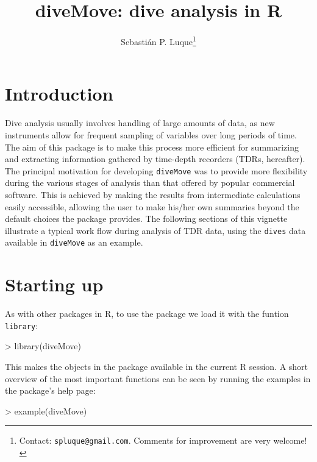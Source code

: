 \documentclass[12pt, letterpaper]{scrartcl}
\newcommand{\Robject}[1]{{\texttt{#1}}}
\newcommand{\Rfunction}[1]{{\texttt{#1}}}
\newcommand{\Rpackage}[1]{{\texttt{#1}}}
\newcommand{\R}{{\normalfont\textsf{R }}{}}
\begin{document}
\title{\bfseries{diveMove: dive analysis in R}}
\author{Sebastián P. Luque\thanks{Contact: \texttt{spluque@gmail.com}.
    Comments for improvement are very welcome!}}
\date{}

\maketitle


\tableofcontents

\section{Introduction}

Dive analysis usually involves handling of large amounts of data, as new
instruments allow for frequent sampling of variables over long periods of
time.  The aim of this package is to make this process more efficient for
summarizing and extracting information gathered by time-depth recorders
(TDRs, hereafter).  The principal motivation for developing
\Rpackage{diveMove} was to provide more flexibility during the various
stages of analysis than that offered by popular commercial software.  This
is achieved by making the results from intermediate calculations easily
accessible, allowing the user to make his/her own summaries beyond the
default choices the package provides.  The following sections of this
vignette illustrate a typical work flow during analysis of TDR data, using
the \Robject{dives} data available in \Rpackage{diveMove} as an example.


\section{Starting up}
\label{sec:starting}

As with other packages in R, to use the package we load it with the
funtion \Rfunction{library}:
\begin{Schunk}
\begin{Sinput}
> library(diveMove)
\end{Sinput}
\end{Schunk}

This makes the objects in the package available in the current \R session.
A short overview of the most important functions can be seen by running
the examples in the package's help page:
\begin{Schunk}
\begin{Sinput}
> example(diveMove)
\end{Sinput}
\end{Schunk}
\end{document}

